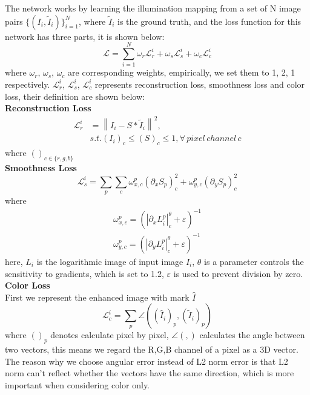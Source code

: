 \documentclass[10pt,twocolumn,letterpaper]{article}
\begin{document}
The network works by learning the illumination mapping from a set of N image pairs $\{(I_i, \tilde{I}_i)\}_{i=1}^N$, where $\tilde{I}_i$ is the ground truth, and the loss function for this network has three parts, it is shown below:
\begin{equation}
    \mathcal{L}= \sum_{i=1}^N \omega_r\mathcal{L}_r^i + \omega_s\mathcal{L}_s^i + \omega_c\mathcal{L}_c^i
\end{equation}
where $\omega_r$, $\omega_s$, $\omega_c$ are corresponding weights, empirically, we set them to 1, 2, 1 respectively. $\mathcal{L}_r^i$, $\mathcal{L}_s^i$, $\mathcal{L}_c^i$ represents reconstruction loss, smoothness loss and color loss, their definition are shown below:\\
\textbf{Reconstruction Loss}
\begin{equation}
    \begin{split}
        \mathcal{L}_r^i & = \left\|I_i - S \ast \tilde{I}_i\right\|^2,\\
       & s.t. (I_i)_c \leq (S)_c \leq 1, \forall\,pixel\,channel\,c
    \end{split}
\end{equation}
where $()_{c \in \{r,g,b\}}$ \\
\textbf{Smoothness Loss}
\begin{equation}
    \mathcal{L}_s^i = \sum_p \sum_c \omega_{x,c}^p(\partial_x S_p)_c^2 + \omega_{y,c}^p(\partial_y S_p)_c^2 
\end{equation}
where
\begin{equation}
    \begin{split}
        \omega_{x,c}^p = (|\partial_x L_i^p|_c^\theta + \varepsilon)^{-1} \\
        \omega_{y,c}^p = (|\partial_y L_i^p|_c^\theta + \varepsilon)^{-1}
    \end{split}
\end{equation}
here, $L_i$ is the logarithmic image of input image $I_i$, $\theta$ is a parameter controls the sensitivity to gradients, which is set to 1.2, $\varepsilon$ is used to prevent division by zero. \\
\textbf{Color Loss} \\
First we represent the enhanced image with mark $\hat{I} $
\begin{equation}
    \mathcal{L}_c^i = \sum_p \angle((\hat{I}_i)_p,(\tilde{I}_i)_p)
\end{equation}
where $()_p$ denotes calculate pixel by pixel, $\angle(,)$ calculates the angle between two vectors, this means we regard the R,G,B channel of a pixel as a 3D vector. The reason why we choose angular error instead of L2 norm error is that L2 norm can't reflect whether the vectors have the same direction, which is more important when considering color only.
\end{document}
